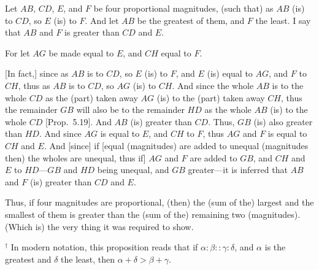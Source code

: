 \begin{Parallel}{}{}
{Let $AB$, $CD$, $E$, and $F$ be four proportional magnitudes, (such that) as
$AB$ (is) to $CD$, so $E$ (is) to $F$. And let $AB$ be the greatest of them, and $F$ the least. I say that $AB$ and $F$ is greater than $CD$ and $E$.

For let $AG$ be made equal to $E$, and $CH$ equal to $F$.

\mbox{[}In fact,] since as $AB$ is to $CD$, so $E$ (is) to $F$, and $E$ (is) equal to $AG$, and
$F$ to $CH$,  thus as $AB$ is to $CD$, so $AG$ (is) to $CH$. And since the whole
$AB$ is to the whole $CD$ as the (part) taken away $AG$ (is) to the
(part) taken away $CH$, thus the remainder $GB$ will also be to the
remainder $HD$ as the whole $AB$ (is) to the whole $CD$ [Prop.~5.19]. And $AB$ (is) greater than $CD$.
Thus, $GB$ (is) also greater than $HD$. And since $AG$ is equal to $E$, and $CH$
to $F$, thus $AG$ and $F$ is equal to $CH$ and $E$. And [since] if [equal (magnitudes)
are added to unequal (magnitudes then) the wholes are unequal, thus if] $AG$ and $F$ are added to $GB$, and $CH$ and
$E$ to $HD$---$GB$ and
$HD$ being unequal, and $GB$ greater---it is inferred that $AB$ and $F$ (is) greater than $CD$ and $E$.

Thus, if four magnitudes are proportional, (then) the (sum of the)
largest  and the smallest of them is greater than the (sum of the) remaining two (magnitudes). (Which is) the very thing it was required to show.}
\end{Parallel}
{\footnotesize \noindent$^\dag$ In modern notation, this proposition
reads that if $\alpha:\beta::\gamma:\delta$, and $\alpha$ is the greatest and $\delta$ the least, then $\alpha+\delta>\beta+\gamma$.}

\newpage~\thispagestyle{empty}
